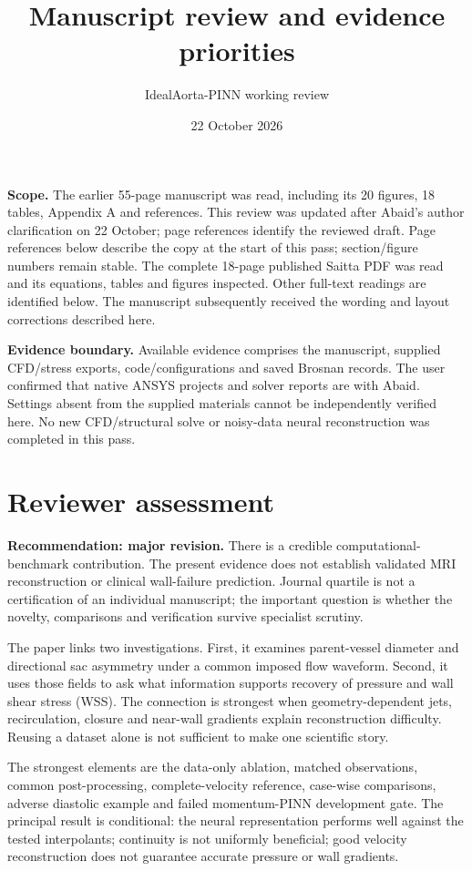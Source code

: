 \documentclass[11pt,a4paper]{article}
\title{Manuscript review and evidence priorities}
\author{IdealAorta-PINN working review}
\date{22 October 2026}
\begin{document}
\maketitle

\textbf{Scope.} The earlier 55-page manuscript was read, including its 20 figures, 18 tables, Appendix A and references. This review was updated after Abaid's author clarification on 22 October; page references identify the reviewed draft. Page references below describe the copy at the start of this pass; section/figure numbers remain stable. The complete 18-page published Saitta PDF was read and its equations, tables and figures inspected. Other full-text readings are identified below. The manuscript subsequently received the wording and layout corrections described here.

\textbf{Evidence boundary.} Available evidence comprises the manuscript, supplied CFD/stress exports, code/configurations and saved Brosnan records. The user confirmed that native ANSYS projects and solver reports are with Abaid. Settings absent from the supplied materials cannot be independently verified here. No new CFD/structural solve or noisy-data neural reconstruction was completed in this pass.

\section{Reviewer assessment}

\textbf{Recommendation: major revision.} There is a credible computational-benchmark contribution. The present evidence does not establish validated MRI reconstruction or clinical wall-failure prediction. Journal quartile is not a certification of an individual manuscript; the important question is whether the novelty, comparisons and verification survive specialist scrutiny.

The paper links two investigations. First, it examines parent-vessel diameter and directional sac asymmetry under a common imposed flow waveform. Second, it uses those fields to ask what information supports recovery of pressure and wall shear stress (WSS). The connection is strongest when geometry-dependent jets, recirculation, closure and near-wall gradients explain reconstruction difficulty. Reusing a dataset alone is not sufficient to make one scientific story.

The strongest elements are the data-only ablation, matched observations, common post-processing, complete-velocity reference, case-wise comparisons, adverse diastolic example and failed momentum-PINN development gate. The principal result is conditional: the neural representation performs well against the tested interpolants; continuity is not uniformly beneficial; good velocity reconstruction does not guarantee accurate pressure or wall gradients.
\end{document}
